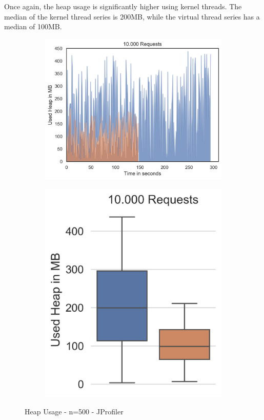 Once again, the heap usage is significantly higher using kernel threads. The median of the kernel thread series is 200MB, while the virtual thread series has a median of 100MB. 

\begin{figure}[H]
  \centering
  \begin{subfigure}[b]{0.45\textwidth}
    \includegraphics[width=1.0\linewidth]{img/footprint/heap_500_line.png}
  \end{subfigure}
  \begin{subfigure}[b]{0.3\textwidth}
    \includegraphics[width=1.0\linewidth]{img/footprint/heap_500_box.png}
  \end{subfigure}
  \caption{Heap Usage - n=500 - JProfiler}
\end{figure}




